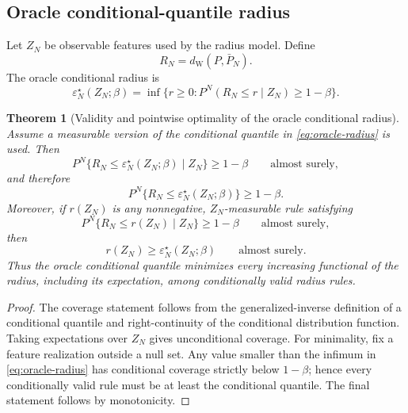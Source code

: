 \documentclass[11pt]{article}
\newtheorem{theorem}{Theorem}[section]
\newcommand{\1}{\mathbf{1}}
\newcommand{\dW}{d_{\mathrm W}}
\newcommand{\Pbar}{\bar P_N}
\begin{document}
\subsection{Oracle conditional-quantile radius}

Let $Z_N$ be observable features used by the radius model. Define
\begin{equation}
    R_N=\dW(P,\Pbar).
\end{equation}
The oracle conditional radius is
\begin{equation}\label{eq:oracle-radius}
    \varepsilon_N^\star(Z_N;\beta)=
    \inf\{r\ge0:P^N(R_N\le r\mid Z_N)\ge1-\beta\}.
\end{equation}

\begin{theorem}[Validity and pointwise optimality of the oracle conditional radius]\label{thm:oracle-radius}
Assume a measurable version of the conditional quantile in \eqref{eq:oracle-radius} is used. Then
\begin{equation}
    P^N\{R_N\le \varepsilon_N^\star(Z_N;\beta)\mid Z_N\}\ge1-\beta
    \qquad\text{almost surely},
\end{equation}
and therefore
\begin{equation}
    P^N\{R_N\le \varepsilon_N^\star(Z_N;\beta)\}\ge1-\beta.
\end{equation}
Moreover, if $r(Z_N)$ is any nonnegative, $Z_N$-measurable rule satisfying
\begin{equation}
    P^N\{R_N\le r(Z_N)\mid Z_N\}\ge1-\beta
    \qquad\text{almost surely},
\end{equation}
then
\begin{equation}
    r(Z_N)\ge \varepsilon_N^\star(Z_N;\beta)
    \qquad\text{almost surely}.
\end{equation}
Thus the oracle conditional quantile minimizes every increasing functional of the radius, including its expectation, among conditionally valid radius rules.
\end{theorem}

\begin{proof}
The coverage statement follows from the generalized-inverse definition of a conditional quantile and right-continuity of the conditional distribution function. Taking expectations over $Z_N$ gives unconditional coverage. For minimality, fix a feature realization outside a null set. Any value smaller than the infimum in \eqref{eq:oracle-radius} has conditional coverage strictly below $1-\beta$; hence every conditionally valid rule must be at least the conditional quantile. The final statement follows by monotonicity.
\end{proof}
\end{document}

